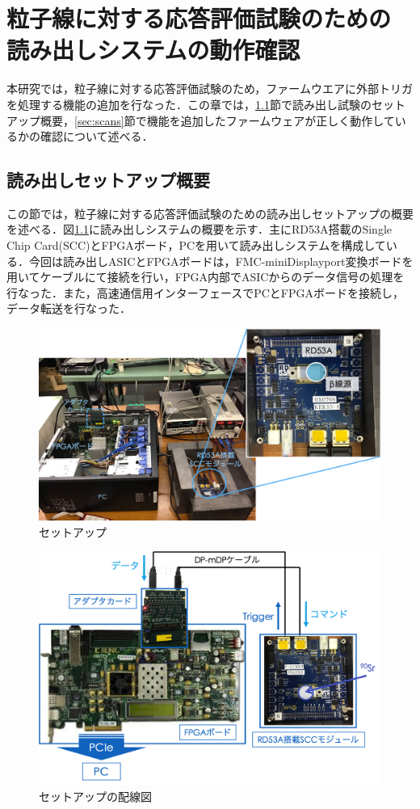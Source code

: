 \chapter{粒子線に対する応答評価試験のための\\読み出しシステムの動作確認}
本研究では，粒子線に対する応答評価試験のため，ファームウエアに外部トリガを処理する機能の追加を行なった．この章では，\ref{sec:setup}節で読み出し試験のセットアップ概要，\ref{sec:scans}節で機能を追加したファームウェアが正しく動作しているかの確認について述べる．

\section{読み出しセットアップ概要}
\label{sec:setup}
この節では，粒子線に対する応答評価試験のための読み出しセットアップの概要を述べる．図\ref{fig:setup}に読み出しシステムの概要を示す．主にRD53A搭載のSingle Chip Card(SCC)とFPGAボード，PCを用いて読み出しシステムを構成している．今回は読み出しASICとFPGAボードは，FMC-miniDisplayport変換ボードを用いてケーブルにて接続を行い，FPGA内部でASICからのデータ信号の処理を行なった．また，高速通信用インターフェースでPCとFPGAボードを接続し，データ転送を行なった．\par

\begin{figure}[h]
  \centering
  \includegraphics[width=15cm]{./figure/Setup.png}
  \caption{セットアップ}
  \label{fig:setup}
\end{figure}

\begin{figure}[h]
  \centering
  \includegraphics[width=12cm]{./figure/Setupcab.png}
  \caption{セットアップの配線図}
  \label{fig:setupcab}
\end{figure}

